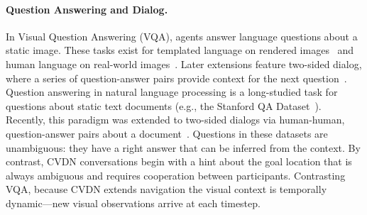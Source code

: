 \documentclass{article}
\newcommand{\dataset}{CVDN}
\begin{document}
\paragraph{Question Answering and Dialog.}
In Visual Question Answering (VQA), agents answer language questions about a static image.
These tasks exist for templated language on rendered images~\cite{johnson:cvpr17} and human language on real-world images~\cite{antol:iccv15,hudson:cvpr18,zellers:cvpr19}.
Later extensions feature two-sided dialog, where a series of question-answer pairs provide context for the next question~\cite{kottur:naacl19,das:cvpr17}.
Question answering in natural language processing is a long-studied task for questions about static text documents (e.g., the Stanford QA Dataset~\cite{rajpurkar:emnlp16}).
Recently, this paradigm was extended to two-sided dialogs via human-human, question-answer pairs about a document~\cite{choi:emnlp18,saeidi:emnlp18,reddy:tacl19}.
Questions in these datasets are unambiguous: they have a right answer that can be inferred from the context.
By contrast, \dataset{} conversations begin with a hint about the goal location that is always ambiguous and requires cooperation between participants.
Contrasting VQA, because \dataset{} extends navigation the visual context is temporally dynamic---new visual observations arrive at each timestep.
\end{document}
